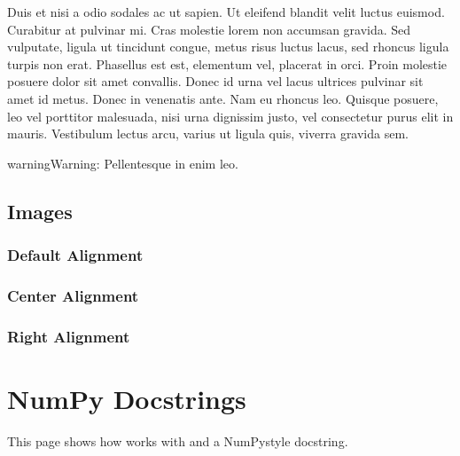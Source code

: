 \documentclass[letterpaper,10pt,english]{sphinxmanual}
\begin{document}
Duis et nisi a odio  sodales ac ut sapien. Ut eleifend blandit
velit luctus euismod. Curabitur at pulvinar mi. Cras molestie lorem non accumsan
gravida. Sed vulputate, ligula ut tincidunt congue, metus risus luctus lacus,
sed rhoncus ligula turpis non erat. Phasellus est est, 
elementum vel, placerat in orci. Proin molestie posuere dolor sit amet
convallis. Donec id urna vel lacus ultrices pulvinar sit amet id metus. Donec
in venenatis ante. Nam eu rhoncus leo. Quisque posuere, leo vel porttitor
malesuada, nisi urna dignissim justo, vel consectetur purus elit in mauris.
Vestibulum lectus arcu, varius ut ligula quis, viverra gravida sem.

\begin{sphinxadmonition}{warning}{Warning:}
Pellentesque in enim leo.
\end{sphinxadmonition}


\section{Images}
\label{\detokenize{specimen:images}}

\subsection{Default Alignment}
\label{\detokenize{specimen:default-alignment}}
\noindent{}


\subsection{Center Alignment}
\label{\detokenize{specimen:center-alignment}}


\subsection{Right Alignment}
\label{\detokenize{specimen:right-alignment}}


\chapter{NumPy Docstrings}
\label{\detokenize{numpydoc:numpy-docstrings}}\label{\detokenize{numpydoc::doc}}
This page shows how  works with  and a
NumPy\sphinxhyphen{}style docstring.
\end{document}
